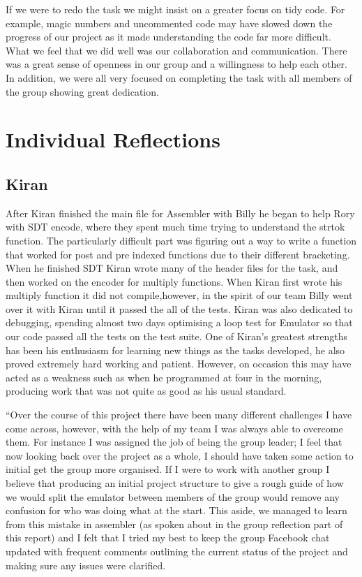 \documentclass[a4wide, 10pt]{article}
\begin{document}
If we were to redo the task we might insist on a greater focus on tidy code. For example, magic numbers and uncommented code may have slowed down the progress of our project as it made understanding the code far more difficult. What we feel that we did well was our collaboration and communication. There was a great sense of openness in our group and a willingness to help each other. In addition, we were all very focused on completing the task with all members of the group showing great dedication.

\section*{Individual Reflections}

\subsection*{Kiran}

After Kiran finished the main file for Assembler with Billy he began to help Rory with SDT encode, where they spent much time trying to understand the strtok function. The particularly difficult part was figuring out a way to write a function that worked for post and pre indexed functions due to their different bracketing. When he finished SDT Kiran wrote many of the header files for the task, and then worked on the encoder for multiply functions. When Kiran first wrote his multiply function it did not compile,however, in the spirit of our team Billy went over it with Kiran until it passed the all of the tests. Kiran was also dedicated to debugging, spending almost two days optimising a loop test for Emulator so that our code passed all the tests on the test suite. One of Kiran's greatest strengths has been his enthusiasm for learning new things as the tasks developed, he also proved extremely hard working and patient. However, on occasion this may have acted as a weakness such as when he programmed at four in the morning, producing work that was not quite as good as his usual standard.

\textquotedblleft Over the course of this project there have been many different challenges I have come across, however, with the help of my team I was always able to overcome them. For instance I was assigned the job of being the group leader; I feel that now looking back over the project as a whole, I should have taken some action to initial get the group more organised. If I were to work with another group I believe that producing an initial project structure to give a rough guide of how we would split the emulator between members of the group would remove any confusion for who was doing what at the start. This aside, we managed to learn from this mistake in assembler (as spoken about in the group reflection part of this report) and I felt that I tried my best to keep the group Facebook chat updated with frequent comments outlining the current status of the project and making sure any issues were clarified.
\end{document}
